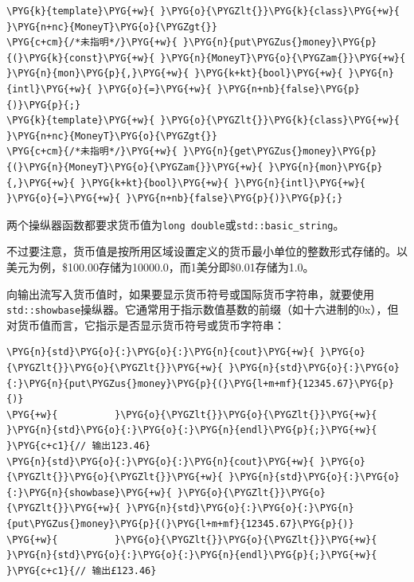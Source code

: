 \begin{codeblockbg}
\begin{Verbatim}[commandchars=\\\{\},breaklines=true,breakanywhere=true,fontsize=\codefont,xleftmargin=17bp]
\PYG{k}{template}\PYG{+w}{ }\PYG{o}{\PYGZlt{}}\PYG{k}{class}\PYG{+w}{ }\PYG{n+nc}{MoneyT}\PYG{o}{\PYGZgt{}}
\PYG{c+cm}{/*未指明*/}\PYG{+w}{ }\PYG{n}{put\PYGZus{}money}\PYG{p}{(}\PYG{k}{const}\PYG{+w}{ }\PYG{n}{MoneyT}\PYG{o}{\PYGZam{}}\PYG{+w}{ }\PYG{n}{mon}\PYG{p}{,}\PYG{+w}{ }\PYG{k+kt}{bool}\PYG{+w}{ }\PYG{n}{intl}\PYG{+w}{ }\PYG{o}{=}\PYG{+w}{ }\PYG{n+nb}{false}\PYG{p}{)}\PYG{p}{;}
\PYG{k}{template}\PYG{+w}{ }\PYG{o}{\PYGZlt{}}\PYG{k}{class}\PYG{+w}{ }\PYG{n+nc}{MoneyT}\PYG{o}{\PYGZgt{}}
\PYG{c+cm}{/*未指明*/}\PYG{+w}{ }\PYG{n}{get\PYGZus{}money}\PYG{p}{(}\PYG{n}{MoneyT}\PYG{o}{\PYGZam{}}\PYG{+w}{ }\PYG{n}{mon}\PYG{p}{,}\PYG{+w}{ }\PYG{k+kt}{bool}\PYG{+w}{ }\PYG{n}{intl}\PYG{+w}{ }\PYG{o}{=}\PYG{+w}{ }\PYG{n+nb}{false}\PYG{p}{)}\PYG{p}{;}
\end{Verbatim}
\end{codeblockbg}



两个操纵器函数都要求货币值为\texttt{long double}或\texttt{std::\allowbreak{}basic\_\allowbreak{}string}。



\begin{myNote}[tip]
不过要注意，货币值是按所用区域设置定义的货币最小单位的整数形式存储的。以美元为例，\$100.00存储为10000.0，而1美分即\$0.01存储为1.0。
\end{myNote}



向输出流写入货币值时，如果要显示货币符号或国际货币字符串，就要使用\texttt{std::\allowbreak{}showbase}操纵器。它通常用于指示数值基数的前缀（如十六进制的0x），但对货币值而言，它指示是否显示货币符号或货币字符串：



\begin{codeblockbg}
\begin{Verbatim}[commandchars=\\\{\},breaklines=true,breakanywhere=true,fontsize=\codefont,xleftmargin=17bp]
\PYG{n}{std}\PYG{o}{:}\PYG{o}{:}\PYG{n}{cout}\PYG{+w}{ }\PYG{o}{\PYGZlt{}}\PYG{o}{\PYGZlt{}}\PYG{+w}{ }\PYG{n}{std}\PYG{o}{:}\PYG{o}{:}\PYG{n}{put\PYGZus{}money}\PYG{p}{(}\PYG{l+m+mf}{12345.67}\PYG{p}{)}
\PYG{+w}{          }\PYG{o}{\PYGZlt{}}\PYG{o}{\PYGZlt{}}\PYG{+w}{ }\PYG{n}{std}\PYG{o}{:}\PYG{o}{:}\PYG{n}{endl}\PYG{p}{;}\PYG{+w}{ }\PYG{c+c1}{// 输出123.46}
\PYG{n}{std}\PYG{o}{:}\PYG{o}{:}\PYG{n}{cout}\PYG{+w}{ }\PYG{o}{\PYGZlt{}}\PYG{o}{\PYGZlt{}}\PYG{+w}{ }\PYG{n}{std}\PYG{o}{:}\PYG{o}{:}\PYG{n}{showbase}\PYG{+w}{ }\PYG{o}{\PYGZlt{}}\PYG{o}{\PYGZlt{}}\PYG{+w}{ }\PYG{n}{std}\PYG{o}{:}\PYG{o}{:}\PYG{n}{put\PYGZus{}money}\PYG{p}{(}\PYG{l+m+mf}{12345.67}\PYG{p}{)}
\PYG{+w}{          }\PYG{o}{\PYGZlt{}}\PYG{o}{\PYGZlt{}}\PYG{+w}{ }\PYG{n}{std}\PYG{o}{:}\PYG{o}{:}\PYG{n}{endl}\PYG{p}{;}\PYG{+w}{ }\PYG{c+c1}{// 输出£123.46}
\end{Verbatim}
\end{codeblockbg}


